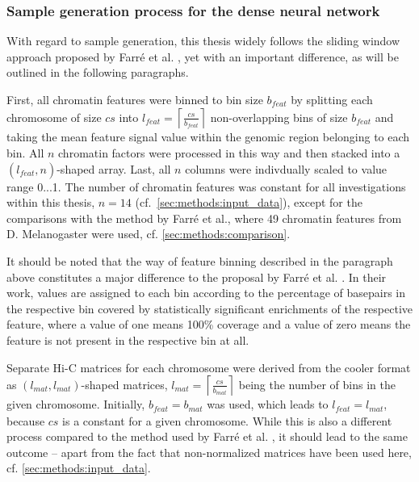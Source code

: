\subsubsection{Sample generation process for the dense neural network} \label{sec:methods:sample_gen}
With regard to sample generation, this thesis widely follows the sliding window approach proposed by Farr\'e et al. \cite{Farre2018a},
yet with an important difference, as will be outlined in the following paragraphs.

First, all chromatin features were binned to bin size $b_\mathit{feat}$ by splitting each chromosome of size $cs$ into 
$l_\mathit{feat}=\left \lceil{\frac{cs}{b_\mathit{feat}}}\right \rceil$ non-overlapping bins of size $b_\mathit{feat}$
and taking the mean feature signal value within the genomic region belonging to each bin.
All $n$ chromatin factors were processed in this way and then stacked into a $(l_\mathit{feat},n)$-shaped array.
Last, all $n$ columns were indivdually scaled to value range 0...1. 
The number of chromatin features was constant for all investigations within this thesis, $n=14$ (cf.~\cref{sec:methods:input_data}),
except for the comparisons with the method by Farr\'e et al., where 49 chromatin features from D. Melanogaster were used, cf. \cref{sec:methods:comparison}.

It should be noted that the way of feature binning described in the paragraph above constitutes a major difference to the proposal by Farr\'e et al. \cite[p.~9]{Farre2018a}.
In their work, values are assigned to each bin according to the percentage of basepairs in the respective bin covered by statistically significant enrichments of the respective feature,
where a value of one means 100\% coverage and a value of zero means the feature is not present in the respective bin at all.

Separate Hi-C matrices for each chromosome were derived from the cooler format as $(l_\mathit{mat}, l_\mathit{mat})$-shaped matrices, 
$l_\mathit{mat}=\left \lceil{\frac{cs}{b_\mathit{mat}}}\right \rceil$ being the number of bins in the given chromosome. 
Initially, $b_\mathit{feat} = b_\mathit{mat}$ was used, which leads to $l_\mathit{feat} = l_\mathit{mat}$, because $cs$ is a constant for a given chromosome.
While this is also a different process compared to the method used by Farr\'e et al. \cite[p.~8f]{Farre2018a}, it should lead to the same outcome --
apart from the fact that non-normalized matrices have been used here, cf. \cref{sec:methods:input_data}.

